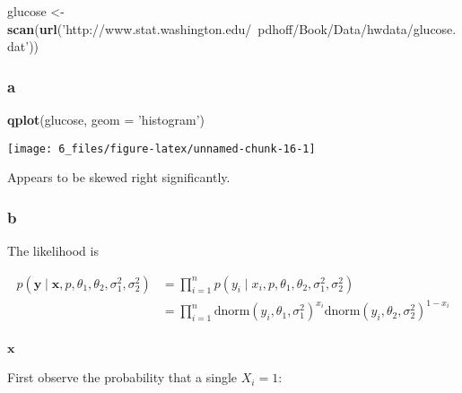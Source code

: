 \documentclass[]{article}
\newenvironment{Shaded}{\begin{snugshade}}{\end{snugshade}}
\newcommand{\DataTypeTok}[1]{\textcolor[rgb]{0.13,0.29,0.53}{#1}}
\newcommand{\KeywordTok}[1]{\textcolor[rgb]{0.13,0.29,0.53}{\textbf{#1}}}
\newcommand{\NormalTok}[1]{#1}
\newcommand{\StringTok}[1]{\textcolor[rgb]{0.31,0.60,0.02}{#1}}
\let\oldparagraph\paragraph
\renewcommand{\paragraph}[1]{\oldparagraph{#1}\mbox{}}
\begin{document}
\begin{Shaded}
\begin{Highlighting}[]
\NormalTok{glucose <-}\StringTok{ }\KeywordTok{scan}\NormalTok{(}\KeywordTok{url}\NormalTok{(}\StringTok{'http://www.stat.washington.edu/~pdhoff/Book/Data/hwdata/glucose.dat'}\NormalTok{))}
\end{Highlighting}
\end{Shaded}

\hypertarget{a-1}{%
\subsubsection{a}\label{a-1}}

\begin{Shaded}
\begin{Highlighting}[]
\KeywordTok{qplot}\NormalTok{(glucose, }\DataTypeTok{geom =} \StringTok{'histogram'}\NormalTok{)}
\end{Highlighting}
\end{Shaded}

\begin{center}\texttt{[image: 6\_files/figure-latex/unnamed-chunk-16-1]} \end{center}

Appears to be skewed right significantly.

\hypertarget{b-1}{%
\subsubsection{b}\label{b-1}}

The likelihood is

\[
\begin{align}
p(\boldsymbol{y} \mid \boldsymbol{x}, p, \theta_1, \theta_2, \sigma^2_1, \sigma^2_2) &= 
\prod_{i = 1}^n p(y_i \mid x_i, p, \theta_1, \theta_2, \sigma^2_1, \sigma^2_2) \\
&= \prod_{i = 1}^n \text{dnorm}(y_i, \theta_1, \sigma^2_1)^{x_i} \text{dnorm}(y_i, \theta_2, \sigma^2_2)^{1 - x_i} \\
\end{align}
\]

\hypertarget{boldsymbolx}{%
\paragraph{\texorpdfstring{\(\boldsymbol{x}\)}{\textbackslash{}boldsymbol\{x\}}}\label{boldsymbolx}}

First observe the probability that a single \(X_i = 1\):
\end{document}
